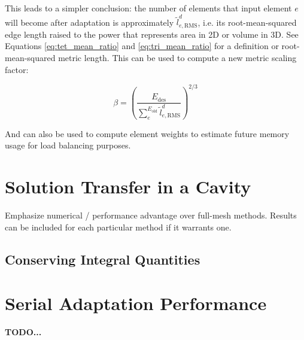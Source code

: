 This leads to a simpler conclusion: the number of elements that
input element $e$ will become after adaptation is approximately
$\tilde{l}_{e,\text{RMS}}^d$, i.e. its root-mean-squared edge length
raised to the power that represents area in 2D or volume in 3D.
See Equations \ref{eq:tet_mean_ratio} and \ref{eq:tri_mean_ratio}
for a definition or root-mean-squared metric length.
This can be used to compute a new metric scaling factor:

\begin{equation}
\beta = \left(\frac{E_{\text{des}}}
{\sum_e^{E_{\text{old}}} \tilde{l}_{e,\text{RMS}}^d}\right)^{2/3}
\end{equation}

And can also be used to compute element weights to estimate
future memory usage for load balancing purposes.

\section{Solution Transfer in a Cavity}

Emphasize numerical / performance advantage
over full-mesh methods.
Results can be included for each particular
method if it warrants one.

\subsection{Conserving Integral Quantities}

\section{Serial Adaptation Performance}

{\bf TODO... }



